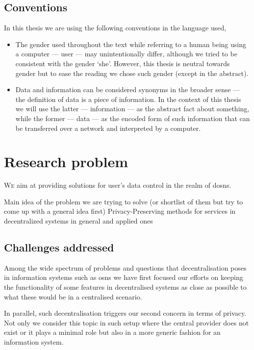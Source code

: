 \documentclass[showtrims]{kthesis}
\begin{document}
\section{Conventions}
In this thesis we are using the following conventions in the language used,
\begin{itemize}
    \item The gender used throughout the text while referring to a human being using 
    a computer --- user --- may unintentionally differ, although we tried to be 
    consistent with the gender `she'. However, this thesis is neutral towards gender 
    but to ease the reading we chose such gender (except in the abstract).

    \item Data and information can be considered synonyms in the broader sense --- 
    the definition of data is a piece of information. In the context of this thesis 
    we will use the latter --- information --- as the abstract fact about something, 
    while the former --- data --- as the encoded form of such information that can 
    be transferred over a network and interpreted by a computer.
\end{itemize}

\chapter{Research problem}
\lettrine{\textcolor[gray]{.25}{W}}{e} aim at providing solutions for user's data 
control in the realm of \acp{dosn}.

Main idea of the problem we are trying to solve (or shortlist of them but try to come up with a general idea first)
Privacy-Preserving methods for services in decentralized systems in general and applied ones


\section{Challenges addressed}
Among the wide spectrum of problems and questions that decentralisation poses in 
information systems such as \acp{osn} we have first focused our efforts on keeping 
the functionality of some features in decentralised systems as close as possible to 
what these would be in a centralised scenario.

In parallel, such decentralisation triggers our second concern in terms of privacy.
Not only we consider this topic in such setup where the central provider does not 
exist or it plays a minimal role but also in a more generic fashion for an information 
system.
\end{document}

